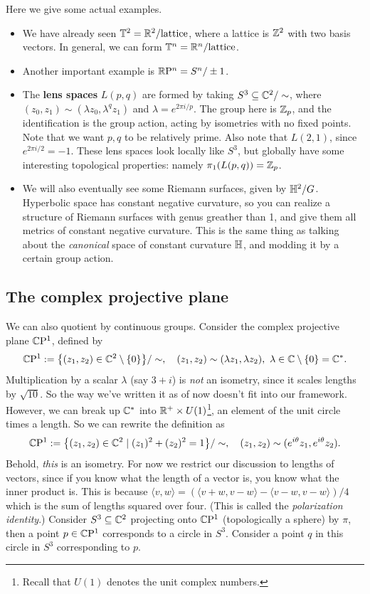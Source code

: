 \begin{example}
    Here we give some actual examples.
    \begin{itemize}
        \item We have already seen $\mathbb{T}^2=\mathbb{R}^2 / \text{lattice} $, where a lattice is $\mathbb{Z}^2$ with two basis vectors. In general, we can form $\mathbb{T}^n =\mathbb{R}^n / \text{lattice}  $.
        \item Another important example is $\mathbb{R} \mathrm P^n=S^n /\pm 1$.
        \item The \textbf{lens spaces} $L(p,q)$ are formed by taking $S^3 \subseteq \mathbb{C}^2 / \sim$, where $(z_0,z_1)\sim (\lambda z_0,\lambda^q z_1)$ and $\lambda =e^{2\pi i /p}$. The group here is $\mathbb{Z}_p$, and the identification is the group action, acting by isometries with no fixed points. Note that we want $p,q$ to be relatively prime. Also note that $L(2,1)$, since $e^{2\pi i/ 2}=-1$. These lens spaces look locally like $S^3$, but globally have some interesting topological properties: namely $\pi_1(L(p,q))=\mathbb{Z}_p$.
        \item We will also eventually see some Riemann surfaces, given by $\mathbb{H}^2 /G$. Hyperbolic space has constant negative curvature, so you can realize a structure of Riemann surfaces with genus greather than 1, and give them all metrics of constant negative curvature. This is the same thing as talking about the \emph{canonical} space of constant curvature $\mathbb{H}$, and modding it by a certain group action.
    \end{itemize}
\end{example}

\subsection{The complex projective plane}
We can also quotient by continuous groups. Consider the complex projective plane $\mathbb{C}\mathrm P^1$, defined by \[
    \mathbb{C} \mathrm P^1 := \big\{(z_1,z_2)\in \mathbb{C}^2\setminus \{0\} \big\} /\sim,\quad (z_1,z_2)\sim (\lambda z_1,\lambda z_2),\ \lambda \in \mathbb{C}\setminus \{0\} =\mathbb{C}^*.
\] Multiplication by a scalar $\lambda$ (say $3+i$) is \emph{not} an isometry, since it scales lengths by $\sqrt{10} $. So the way we've written it as of now doesn't fit into our framework. However, we can break up $\mathbb{C}^*$ into $\mathbb{R}^+\times U(1) $\footnote{Recall that $U(1)$ denotes the unit complex numbers.}, an element of the unit circle times a length. So we can rewrite the definition as \[
\mathbb{C}\mathrm P^1 :=\big\{(z_1,z_2)\in \mathbb{C}^2\mid (z_1)^2+(z_2)^2=1\big\} / \sim,\quad (z_1,z_2)\sim (e^{i\theta}z_1,e^{i\theta}z_2) .
\] Behold, \emph{this} is an isometry. For now we restrict our discussion to lengths of vectors, since if you know what the length of a vector is, you know what the inner product is. This is because $\langle v,w \rangle =(\langle v+w,v-w \rangle -\langle v-w,v-w \rangle )/4$ which is the sum of lengths squared over four. (This is called the \emph{polarization identity}.) Consider $S^3 \subseteq \mathbb{C}^2 $ projecting onto $\mathbb{C}\mathrm P^1$ (topologically a sphere) by $\pi$, then a point $p \in \mathbb{C} \mathrm P^1$ corresponds to a circle in $S^3$. Consider a point $q$ in this circle in $S^3$ corresponding to $p$. 

